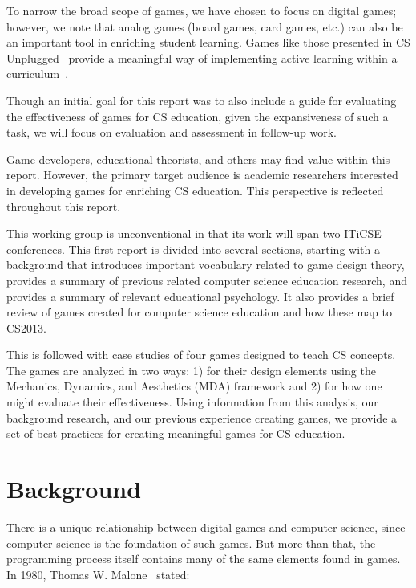 \documentclass{sig-alternate-05-2015}
\begin{document}
To narrow the broad scope of games, we have chosen to focus on digital games; however, we note that analog games (board games, card games, etc.) can also be an important tool in enriching student learning. Games like those presented in CS Unplugged~\cite{bell2009computer} provide a meaningful way of implementing active learning within a curriculum~\cite{brc12}.



Though an initial goal for this report was to also include a guide for evaluating the effectiveness of games for CS education, given the expansiveness of such a task, we will focus on evaluation and assessment in follow-up work.



Game developers, educational theorists, and others may find value within this report. However, the primary target audience is academic researchers interested in developing games for enriching CS education. This perspective is reflected throughout this report. 



This working group is unconventional in that its work will span two ITiCSE conferences. This first report is divided into several sections, starting with a background that introduces important vocabulary related to game design theory, provides a summary of previous related computer science education research, and provides a summary of relevant educational psychology. It also provides a brief review of games created for computer science education and how these map to CS2013. 



This is followed with case studies of four games designed to teach CS concepts. The games are analyzed in two ways: 1) for their design elements using the Mechanics, Dynamics, and Aesthetics (MDA) framework and 2) for how one might evaluate their effectiveness. Using information from this analysis, our background research, and our previous experience creating games, we provide a set of best practices for creating meaningful games for CS education. \section{Background}


\label{section:background}

There is a unique relationship between digital games and computer science, since computer science is the foundation of such games. But more than that, the programming process itself contains many of the same elements found in games. In 1980, Thomas W. Malone~\cite{malone80what} stated: 
\end{document}
